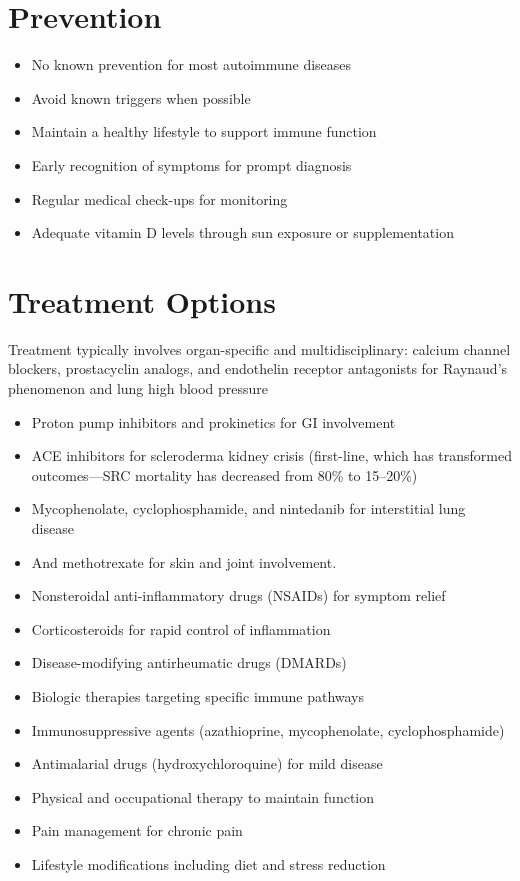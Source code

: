 \section{Prevention}
\begin{itemize}[noitemsep]
  \item No known prevention for most autoimmune diseases
  \item Avoid known triggers when possible
  \item Maintain a healthy lifestyle to support immune function
  \item Early recognition of symptoms for prompt diagnosis
  \item Regular medical check-ups for monitoring
  \item Adequate vitamin D levels through sun exposure or supplementation
\end{itemize}
\section{Treatment Options}
Treatment typically involves organ-specific and multidisciplinary: calcium channel blockers, prostacyclin analogs, and endothelin receptor antagonists for Raynaud's phenomenon and lung high blood pressure

\begin{itemize}[noitemsep]
  \item Proton pump inhibitors and prokinetics for GI involvement
  \item ACE inhibitors for scleroderma kidney crisis (first-line, which has transformed outcomes---SRC mortality has decreased from 80\% to 15--20\%)
  \item Mycophenolate, cyclophosphamide, and nintedanib for interstitial lung disease
  \item And methotrexate for skin and joint involvement.
  \item Nonsteroidal anti-inflammatory drugs (NSAIDs) for symptom relief
  \item Corticosteroids for rapid control of inflammation
  \item Disease-modifying antirheumatic drugs (DMARDs)
  \item Biologic therapies targeting specific immune pathways
  \item Immunosuppressive agents (azathioprine, mycophenolate, cyclophosphamide)
  \item Antimalarial drugs (hydroxychloroquine) for mild disease
  \item Physical and occupational therapy to maintain function
  \item Pain management for chronic pain
  \item Lifestyle modifications including diet and stress reduction
\end{itemize}
